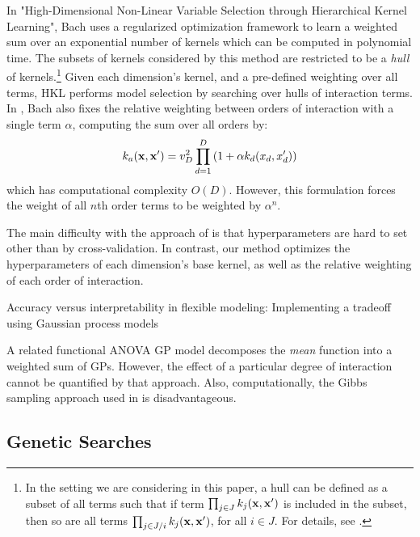 \documentclass[twoside]{article}
\theoremstyle{definition}
\theoremstyle{remark}
\numberwithin{equation}{section}
\numberwithin{thm}{section}
\begin{document}
In "High-Dimensional Non-Linear Variable Selection through Hierarchical Kernel Learning", Bach\cite{DBLP:journals/corr/abs-0909-0844} uses a regularized optimization framework to learn a weighted sum over an exponential number of kernels which can be computed in polynomial time.  The subsets of kernels considered by this method are restricted to be a \textit{hull} of kernels.\footnote{In the setting we are considering in this paper, a hull can be defined as a subset of all terms such that if term $\prod_{j \in J} k_j(\bf x, x')$ is included in the subset, then so are all terms $\prod_{j \in J / i} k_j(\bf x, x')$, for all $i \in J$.  For details, see \cite{DBLP:journals/corr/abs-0909-0844}.}
Given each dimension's kernel, and a pre-defined weighting over all terms, HKL performs model selection by searching over hulls of interaction terms.
In \cite{DBLP:journals/corr/abs-0909-0844}, Bach also fixes the relative weighting between orders of interaction with a single term $\alpha$, computing the sum over all orders by:
\begin{equation}
\label{eqn:uniform}
k_{a}({\bf x, x'}) = v_D^2 \prod_{d=1}^D \left(1 + \alpha k_{d}(x_{d}, x_{d}') \right)
\end{equation}
which has computational complexity $O(D)$.  However, this formulation forces the weight of all $n$th order terms to be weighted by $\alpha^n$.

The main difficulty with the approach of \cite{DBLP:journals/corr/abs-0909-0844} is that hyperparameters are hard to set other than by cross-validation.  In contrast, our method optimizes the hyperparameters of each dimension's base kernel, as well as the relative weighting of each order of interaction. 

Accuracy versus interpretability in flexible modeling: Implementing a tradeoff using Gaussian process models \cite{plate1999accuracy}

A related functional ANOVA GP model\cite{kaufman2010bayesian} decomposes the \emph{mean} function into a weighted sum of GPs. However, the effect of a particular degree of interaction cannot be quantified by that approach. Also, computationally, the Gibbs sampling approach used in \cite{kaufman2010bayesian} is disadvantageous.

\subsection{Genetic Searches}
\end{document}
